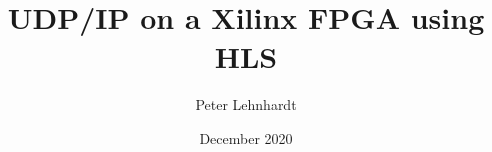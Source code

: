 



\title{UDP/IP on a Xilinx FPGA using HLS}
\author{Peter Lehnhardt}
\date{December 2020}
\maketitle

\clearpage
\tableofcontents

\clearpage

\clearpage

\clearpage


\clearpage
\appendix

\clearpage
\lstlistoflistings{}
\listoffigures
\listoftables

\clearpage
{}



